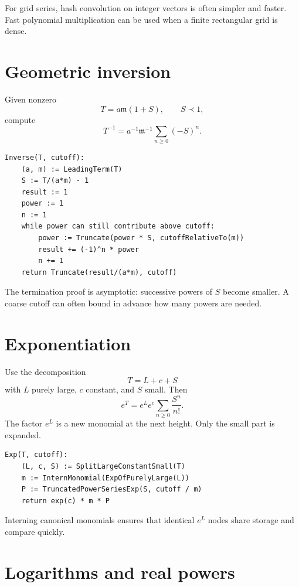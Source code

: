 \documentclass[11pt,openany]{book}
\theoremstyle{definition}
\theoremstyle{plain}
\theoremstyle{remark}
\newcommand{\m}{\mathfrak{m}}
\newcommand{\precdom}{\prec}
\begin{document}
For grid series, hash convolution on integer vectors is often simpler and faster. Fast polynomial multiplication can be used when a finite rectangular grid is dense.

\section{Geometric inversion}

Given nonzero
\[
 T=a\m(1+S),
 \qquad S\precdom1,
\]
compute
\begin{equation}\label{eq:computational-inverse}
 T^{-1}=a^{-1}\m^{-1}\sum_{n\ge0}(-S)^n.
\end{equation}

\begin{lstlisting}[style=pseudo]
Inverse(T, cutoff):
    (a, m) := LeadingTerm(T)
    S := T/(a*m) - 1
    result := 1
    power := 1
    n := 1
    while power can still contribute above cutoff:
        power := Truncate(power * S, cutoffRelativeTo(m))
        result += (-1)^n * power
        n += 1
    return Truncate(result/(a*m), cutoff)
\end{lstlisting}

The termination proof is asymptotic: successive powers of $S$ become smaller. A coarse cutoff can often bound in advance how many powers are needed.

\section{Exponentiation}

Use the decomposition
\[
 T=L+c+S
\]
with $L$ purely large, $c$ constant, and $S$ small. Then
\begin{equation}\label{eq:computational-exp}
 e^T=e^Le^c\sum_{n\ge0}\frac{S^n}{n!}.
\end{equation}
The factor $e^L$ is a new monomial at the next height. Only the small part is expanded.

\begin{lstlisting}[style=pseudo]
Exp(T, cutoff):
    (L, c, S) := SplitLargeConstantSmall(T)
    m := InternMonomial(ExpOfPurelyLarge(L))
    P := TruncatedPowerSeriesExp(S, cutoff / m)
    return exp(c) * m * P
\end{lstlisting}

Interning canonical monomials ensures that identical $e^L$ nodes share storage and compare quickly.

\section{Logarithms and real powers}
\end{document}
